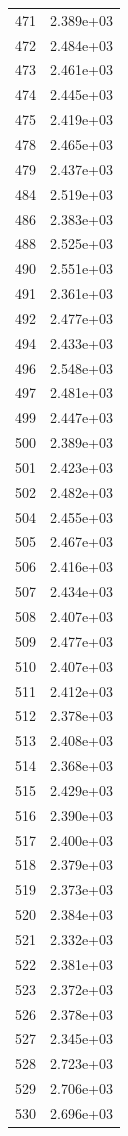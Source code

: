 \documentclass[12pt]{article}
\begin{document}
\begin{longtable}{@{}cc@{}}
471 & 2.389e+03 \\
472 & 2.484e+03 \\
473 & 2.461e+03 \\
474 & 2.445e+03 \\
475 & 2.419e+03 \\
478 & 2.465e+03 \\
479 & 2.437e+03 \\
484 & 2.519e+03 \\
486 & 2.383e+03 \\
488 & 2.525e+03 \\
490 & 2.551e+03 \\
491 & 2.361e+03 \\
492 & 2.477e+03 \\
494 & 2.433e+03 \\
496 & 2.548e+03 \\
497 & 2.481e+03 \\
499 & 2.447e+03 \\
500 & 2.389e+03 \\
501 & 2.423e+03 \\
502 & 2.482e+03 \\
504 & 2.455e+03 \\
505 & 2.467e+03 \\
506 & 2.416e+03 \\
507 & 2.434e+03 \\
508 & 2.407e+03 \\
509 & 2.477e+03 \\
510 & 2.407e+03 \\
511 & 2.412e+03 \\
512 & 2.378e+03 \\
513 & 2.408e+03 \\
514 & 2.368e+03 \\
515 & 2.429e+03 \\
516 & 2.390e+03 \\
517 & 2.400e+03 \\
518 & 2.379e+03 \\
519 & 2.373e+03 \\
520 & 2.384e+03 \\
521 & 2.332e+03 \\
522 & 2.381e+03 \\
523 & 2.372e+03 \\
526 & 2.378e+03 \\
527 & 2.345e+03 \\
528 & 2.723e+03 \\
529 & 2.706e+03 \\
530 & 2.696e+03 \\

\end{longtable}
\end{document}
